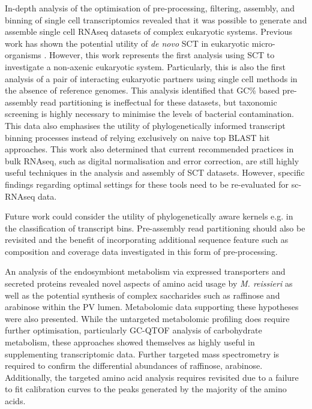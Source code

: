 In-depth analysis of the optimisation of pre-processing,
filtering, assembly, and binning of single cell transcriptomics
revealed that it was possible to generate and assemble
single cell RNAseq datasets of complex eukaryotic
systems. Previous work has shown the potential utility
of \textit{de novo} SCT in eukaryotic micro-organisms \citep{Kolisko2014}.
However, this work represents the first analysis
using SCT to investigate a non-axenic eukaryotic system.
Particularly, this is also the first analysis of a pair
of interacting eukaryotic partners using single cell methods
in the absence of reference genomes. 
This analysis identified that GC\% based pre-assembly read partitioning
is ineffectual for these datasets, but taxonomic screening
is highly necessary to minimise the levels of bacterial contamination.
This data also emphasises the utility of phylogenetically
informed transcript binning processes instead of relying
exclusively on naive top BLAST hit approaches. 
This work also determined that current recommended practices
 in bulk RNAseq, such as digital normalisation and error correction,
 are still highly useful techniques in the analysis and assembly
 of SCT datasets. However, specific findings regarding optimal 
 settings for these tools need to be re-evaluated for sc-RNAseq data.

Future work could consider the utility of phylogenetically aware
kernels e.g. \citep{Vert2002} in the classification
of transcript bins. Pre-assembly read partitioning
should also be revisited and the benefit of incorporating
additional sequence feature such as composition
and coverage data investigated in this form of pre-processing.


An analysis of the endosymbiont metabolism via expressed 
transporters and secreted proteins revealed novel
aspects of amino acid usage by \textit{M. reissieri}
as well as the potential synthesis of complex saccharides
such as raffinose and arabinose within the PV lumen. 
Metabolomic data supporting these hypotheses
were also presented.  While the untargeted metabolomic profiling
does require further optimisation, particularly GC-QTOF analysis
of carbohydrate metabolism, these approaches showed themselves as highly
useful in supplementing transcriptomic data.
Further targeted mass spectrometry is required to confirm
the differential abundances of raffinose, arabinose.
Additionally, the targeted amino acid analysis requires
revisited due to a failure to fit calibration curves to the peaks
generated by the majority of the amino acids. 

